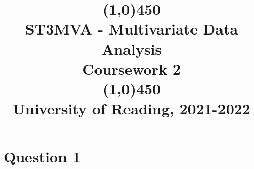 \documentclass[openany]{article}
\title{\line(1,0){450}\\ ST3MVA - Multivariate Data Analysis \\ \large{Coursework 2}  \\\line(1,0){450} \\University of Reading, 2021-2022}
\begin{document}
	\maketitle
	\pagebreak
	
	\section*{Question 1}
%
%
	
\end{document}
